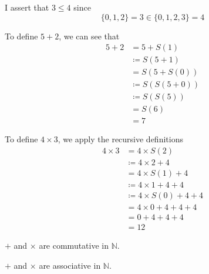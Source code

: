   \begin{example}[Order]
    \label{ex:order}
    I assert that $3 \leq 4$ since 
    \begin{equation}
      \{0, 1, 2\} = 3 \in \{0, 1, 2, 3 \} = 4
    \end{equation}
  \end{example}

  \begin{example}[Addition]
    \label{ex:addition}
    To define $5 + 2$, we can see that 
    \begin{align}
      5 + 2 & = 5 + S(1) \\
            & \coloneqq S(5 + 1) \\
            & = S(5 + S(0)) \\
            & \coloneqq S(S(5 + 0)) \\
            & \coloneqq S(S(5)) \\
            & = S(6) \\
            & = 7
    \end{align}
  \end{example}

  \begin{example}[Multiplication]
    \label{ex:multiplication}
    To define $4 \times 3$, we apply the recursive definitions 
    \begin{align}
      4 \times 3 & = 4 \times S(2) \\
                 & \coloneqq 4 \times 2 + 4 \\
                 & = 4 \times S(1) + 4 \\
                 & \coloneqq 4 \times 1 + 4 + 4 \\
                 & \coloneqq 4 \times S(0) + 4 + 4 \\
                 & = 4 \times 0 + 4 + 4 + 4 \\
                 & = 0 + 4 + 4 + 4 \\
                 & = 12
    \end{align}
  \end{example}

  \begin{theorem}[Commutative]
    \label{thm:commutative}
    $+$ and $\times$ are commutative in $\mathbb{N}$. 
  \end{theorem}

  \begin{theorem}[Associativity]
    \label{thm:associativity-2}
    $+$ and $\times$ are associative in $\mathbb{N}$. 
  \end{theorem}

